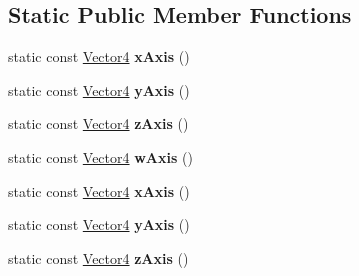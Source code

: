 \subsection*{Static Public Member Functions}
\begin{DoxyCompactItemize}
\item 
\hypertarget{class_vectormath_1_1_aos_1_1_vector4_a1020ecb39a0def75d63df5119053e759}{static const \hyperlink{class_vectormath_1_1_aos_1_1_vector4}{Vector4} {\bfseries x\+Axis} ()}\label{class_vectormath_1_1_aos_1_1_vector4_a1020ecb39a0def75d63df5119053e759}

\item 
\hypertarget{class_vectormath_1_1_aos_1_1_vector4_a601a8b52b5fa1b85a80b0e74a1176e78}{static const \hyperlink{class_vectormath_1_1_aos_1_1_vector4}{Vector4} {\bfseries y\+Axis} ()}\label{class_vectormath_1_1_aos_1_1_vector4_a601a8b52b5fa1b85a80b0e74a1176e78}

\item 
\hypertarget{class_vectormath_1_1_aos_1_1_vector4_a361eacad2ab72d82e16174309c54ee40}{static const \hyperlink{class_vectormath_1_1_aos_1_1_vector4}{Vector4} {\bfseries z\+Axis} ()}\label{class_vectormath_1_1_aos_1_1_vector4_a361eacad2ab72d82e16174309c54ee40}

\item 
\hypertarget{class_vectormath_1_1_aos_1_1_vector4_a9743b490b3efeae0b574a59cfc4e602e}{static const \hyperlink{class_vectormath_1_1_aos_1_1_vector4}{Vector4} {\bfseries w\+Axis} ()}\label{class_vectormath_1_1_aos_1_1_vector4_a9743b490b3efeae0b574a59cfc4e602e}

\item 
\hypertarget{class_vectormath_1_1_aos_1_1_vector4_ac6b4788fd011f0153aff4debca27243e}{static const \hyperlink{class_vectormath_1_1_aos_1_1_vector4}{Vector4} {\bfseries x\+Axis} ()}\label{class_vectormath_1_1_aos_1_1_vector4_ac6b4788fd011f0153aff4debca27243e}

\item 
\hypertarget{class_vectormath_1_1_aos_1_1_vector4_ab32787000390d1bdda06b5814289b3d8}{static const \hyperlink{class_vectormath_1_1_aos_1_1_vector4}{Vector4} {\bfseries y\+Axis} ()}\label{class_vectormath_1_1_aos_1_1_vector4_ab32787000390d1bdda06b5814289b3d8}

\item 
\hypertarget{class_vectormath_1_1_aos_1_1_vector4_a7e8759f580cc05d0f4c215feaea92761}{static const \hyperlink{class_vectormath_1_1_aos_1_1_vector4}{Vector4} {\bfseries z\+Axis} ()}\label{class_vectormath_1_1_aos_1_1_vector4_a7e8759f580cc05d0f4c215feaea92761}


\end{DoxyCompactItemize}
